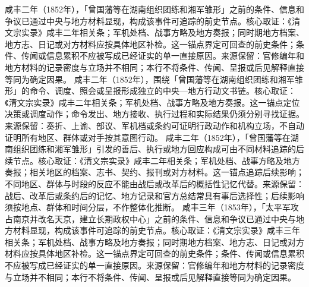 咸丰二年（1852年），「曾国藩等在湖南组织团练和湘军雏形」之前的条件、信息和争议已通过中央与地方材料显现，构成该事件可追踪的前史节点。核心取证：《清文宗实录》咸丰二年相关条；军机处档、战事方略及地方奏报；同时期地方档案、地方志、日记或对方材料应按具体地区补检。这一锚点界定可回查的前史条件；条件、传闻或信息累积不应被写成已经证实的单一直接原因。来源保留：官修编年和地方材料的记录密度与立场并不相同；本行不将条件、传闻、呈报或后见解释直接等同为确定因果。
咸丰二年（1852年），围绕「曾国藩等在湖南组织团练和湘军雏形」的命令、调度、照会或呈报形成独立的中央—地方行动文书链。核心取证：《清文宗实录》咸丰二年相关条；军机处档、战事方略及地方奏报。这一锚点定位决策或调度动作；命令发出、地方接收、执行过程和实际结果仍须分别寻找证据。来源保留：奏折、上谕、部议、军机档或条约可证明行政动作和机构立场，不自动证明所有地区、群体或对手按其意图行动。
咸丰二年（1852年），「曾国藩等在湖南组织团练和湘军雏形」引发的善后、执行或地方回应构成可由不同材料追踪的后续节点。核心取证：《清文宗实录》咸丰二年相关条；军机处档、战事方略及地方奏报；相关地区的档案、志书、契约、报刊或对方材料。这一锚点追踪后续影响；不同地区、群体与时段的反应不能由战后或改革后的概括性记忆代替。来源保留：战后、改革后或条约后的记忆、地方记录和官方总结常具有事后选择性；后续影响须按地点、群体和时间分层，不作整体化推断。
咸丰三年（1853年），「太平军攻占南京并改名天京，建立长期政权中心」之前的条件、信息和争议已通过中央与地方材料显现，构成该事件可追踪的前史节点。核心取证：《清文宗实录》咸丰三年相关条；军机处档、战事方略及地方奏报；同时期地方档案、地方志、日记或对方材料应按具体地区补检。这一锚点界定可回查的前史条件；条件、传闻或信息累积不应被写成已经证实的单一直接原因。来源保留：官修编年和地方材料的记录密度与立场并不相同；本行不将条件、传闻、呈报或后见解释直接等同为确定因果。

